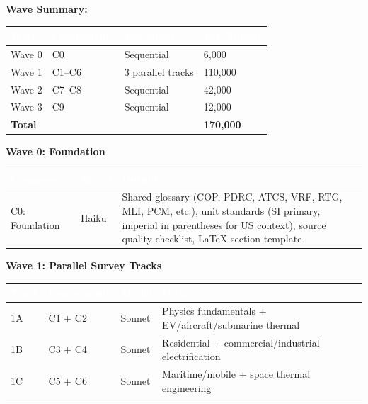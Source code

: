 \documentclass[11pt,letterpaper]{article}
\newcommand{\tableheader}[1]{\textbf{\sffamily\textcolor{white}{#1}}}
\begin{document}
\textbf{Wave Summary:}

\begin{center}
\begin{tabularx}{\textwidth}{L{2cm}L{2.5cm}C{2cm}C{2cm}}
\toprule
{}
\tableheader{Wave} & \tableheader{Components} & \tableheader{Execution} & \tableheader{Est. Tokens} \\
\midrule
Wave 0 & C0 & Sequential & 6,000 \\
Wave 1 & C1--C6 & 3 parallel tracks & 110,000 \\
Wave 2 & C7--C8 & Sequential & 42,000 \\
Wave 3 & C9 & Sequential & 12,000 \\
\midrule
\textbf{Total} & & & \textbf{170,000} \\
\bottomrule
\end{tabularx}
\end{center}

\textbf{Wave 0: Foundation}

\begin{center}
\begin{tabularx}{\textwidth}{L{2.5cm}L{2cm}X}
\toprule
{}
\tableheader{Component} & \tableheader{Model} & \tableheader{Output} \\
\midrule
C0: Foundation & Haiku & Shared glossary (COP, PDRC, ATCS, VRF, RTG, MLI, PCM, etc.), unit standards (SI primary, imperial in parentheses for US context), source quality checklist, LaTeX section template \\
\bottomrule
\end{tabularx}
\end{center}

\textbf{Wave 1: Parallel Survey Tracks}

\begin{center}
\begin{tabularx}{\textwidth}{L{1.5cm}L{2.5cm}L{2cm}X}
\toprule
{}
\tableheader{Track} & \tableheader{Components} & \tableheader{Model} & \tableheader{Focus} \\
\midrule
1A & C1 + C2 & Sonnet & Physics fundamentals + EV/aircraft/submarine thermal \\
1B & C3 + C4 & Sonnet & Residential + commercial/industrial electrification \\
1C & C5 + C6 & Sonnet & Maritime/mobile + space thermal engineering \\
\bottomrule
\end{tabularx}
\end{center}
\end{document}
